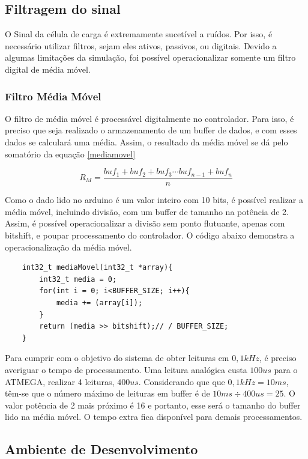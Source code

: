 \documentclass[a4paper, 12pt]{article}
\begin{document}
\subsection{Filtragem do sinal}

O Sinal da célula de carga é extremamente sucetível a ruídos. Por isso, é necessário utilizar filtros, sejam eles ativos, passivos, ou digitais. Devido a algumas limitações da simulação, foi possível operacionalizar somente um filtro digital de média móvel.

\subsubsection{Filtro Média Móvel}
O filtro de média móvel é processável digitalmente no controlador. Para isso, é preciso que seja realizado o armazenamento de um buffer de dados, e com esses dados se calculará uma média. Assim, o resultado da média móvel se dá pelo somatório da equação \ref{mediamovel}

\begin{equation}
	R_M = \dfrac{buf_1+buf_2 + buf_3\cdots buf_{n-1} + buf_n}{n}
	\label{mediamovel}
\end{equation}

Como o dado lido no arduino é um valor inteiro com 10 bits, é possível realizar a média móvel, incluindo divisão, com um buffer de tamanho na potência de 2. Assim, é possível operacionalizar a divisão sem ponto flutuante, apenas com bitshift, e poupar processamento do controlador.
O código abaixo demonstra a operacionalização da média móvel.

\begin{verbatim}
	int32_t mediaMovel(int32_t *array){
		int32_t media = 0;
		for(int i = 0; i<BUFFER_SIZE; i++){
			media += (array[i]);
		}
		return (media >> bitshift);// / BUFFER_SIZE;
	}
\end{verbatim}

Para cumprir com o objetivo do sistema de obter leituras em $ 0,1kHz $, é preciso averiguar o tempo de processamento. Uma leitura analógica custa $ 100us $ para o ATMEGA, realizar 4 leituras, $ 400us $. Considerando que que $ 0,1kHz = 10ms $, têm-se que o número máximo de leituras em buffer é de $ 10ms\div400us = 25 $. O valor potência de 2 mais próximo é 16 e portanto, esse será o tamanho do buffer lido na média móvel. O tempo extra fica disponível para demais processamentos. 
	
	\subsection{Ambiente de Desenvolvimento}
	
\end{document}
